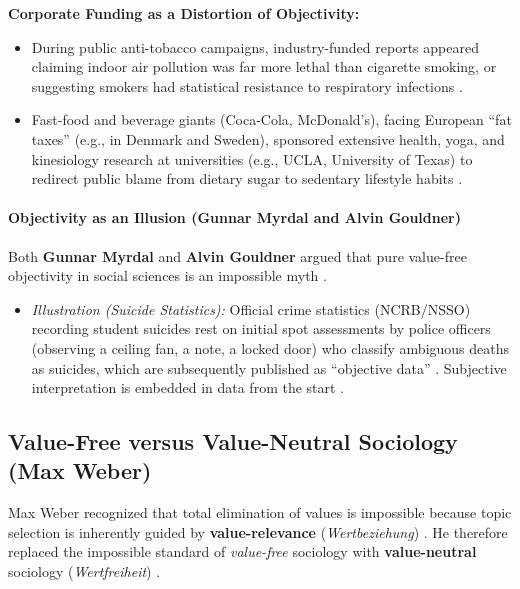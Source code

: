 \begin{CriticalPoint}
\textbf{Corporate Funding as a Distortion of Objectivity:}
\begin{itemize}
    \item During public anti-tobacco campaigns, industry-funded reports appeared claiming indoor air pollution was far more lethal than cigarette smoking, or suggesting smokers had statistical resistance to respiratory infections .
    \item Fast-food and beverage giants (Coca-Cola, McDonald's), facing European ``fat taxes'' (e.g., in Denmark and Sweden), sponsored extensive health, yoga, and kinesiology research at universities (e.g., UCLA, University of Texas) to redirect public blame from dietary sugar to sedentary lifestyle habits .
\end{itemize}
\end{CriticalPoint}

\paragraph{Objectivity as an Illusion (Gunnar Myrdal and Alvin Gouldner)}
Both \textbf{Gunnar Myrdal} and \textbf{Alvin Gouldner} argued that pure value-free objectivity in social sciences is an impossible myth .
\begin{itemize}
    \item \textit{Illustration (Suicide Statistics):} Official crime statistics (NCRB/NSSO) recording student suicides rest on initial spot assessments by police officers (observing a ceiling fan, a note, a locked door) who classify ambiguous deaths as suicides, which are subsequently published as ``objective data'' . Subjective interpretation is embedded in data from the start .
\end{itemize}

\subsection{Value-Free versus Value-Neutral Sociology (Max Weber)}
Max Weber recognized that total elimination of values is impossible because topic selection is inherently guided by \textbf{value-relevance} (\textit{Wertbeziehung}) . He therefore replaced the impossible standard of \textit{value-free} sociology with \textbf{value-neutral} sociology (\textit{Wertfreiheit}) .

